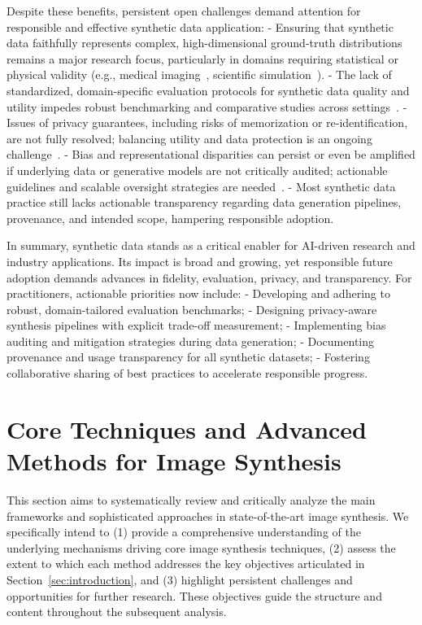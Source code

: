 \documentclass[sigconf]{acmart}
\begin{document}
Despite these benefits, persistent open challenges demand attention for responsible and effective synthetic data application:
- Ensuring that synthetic data faithfully represents complex, high-dimensional ground-truth distributions remains a major research focus, particularly in domains requiring statistical or physical validity (e.g., medical imaging~\cite{ref89}, scientific simulation~\cite{ref15,ref17,ref74}).
- The lack of standardized, domain-specific evaluation protocols for synthetic data quality and utility impedes robust benchmarking and comparative studies across settings~\cite{ref13,ref62,ref87,ref88,ref89}.
- Issues of privacy guarantees, including risks of memorization or re-identification, are not fully resolved; balancing utility and data protection is an ongoing challenge~\cite{ref13,ref21,ref87,ref88}.
- Bias and representational disparities can persist or even be amplified if underlying data or generative models are not critically audited; actionable guidelines and scalable oversight strategies are needed~\cite{ref87,ref88}.
- Most synthetic data practice still lacks actionable transparency regarding data generation pipelines, provenance, and intended scope, hampering responsible adoption.

In summary, synthetic data stands as a critical enabler for AI-driven research and industry applications. Its impact is broad and growing, yet responsible future adoption demands advances in fidelity, evaluation, privacy, and transparency. For practitioners, actionable priorities now include:
- Developing and adhering to robust, domain-tailored evaluation benchmarks;
- Designing privacy-aware synthesis pipelines with explicit trade-off measurement;
- Implementing bias auditing and mitigation strategies during data generation;
- Documenting provenance and usage transparency for all synthetic datasets;
- Fostering collaborative sharing of best practices to accelerate responsible progress.

\section{Core Techniques and Advanced Methods for Image Synthesis}

This section aims to systematically review and critically analyze the main frameworks and sophisticated approaches in state-of-the-art image synthesis. We specifically intend to (1) provide a comprehensive understanding of the underlying mechanisms driving core image synthesis techniques, (2) assess the extent to which each method addresses the key objectives articulated in Section~\ref{sec:introduction}, and (3) highlight persistent challenges and opportunities for further research. These objectives guide the structure and content throughout the subsequent analysis.
\end{document}
